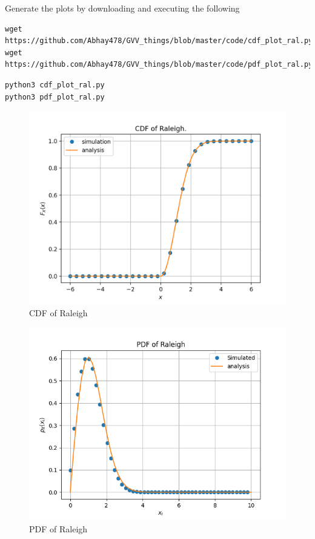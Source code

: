 \documentclass[journal,12pt,twocolumn]{IEEEtran}
\renewcommand\thesection{\arabic{section}}
\theoremstyle{remark}
\numberwithin{equation}{section}
\numberwithin{equation}{section}
\begin{document}
\begin{enumerate}[label=\thesection.\arabic*,ref=\thesection.\theenumi]
Generate the plots by downloading and executing the following
\begin{lstlisting}
wget https://github.com/Abhay478/GVV_things/blob/master/code/cdf_plot_ral.py
wget https://github.com/Abhay478/GVV_things/blob/master/code/pdf_plot_ral.py
\end{lstlisting}

\begin{lstlisting}
python3 cdf_plot_ral.py
python3 pdf_plot_ral.py
\end{lstlisting}

\begin{figure}[!h]
    \caption{CDF of Raleigh}
    \includegraphics[width = \columnwidth]{ral.png}
\end{figure}


\begin{figure}[!h]
    \caption{PDF of Raleigh}
    \includegraphics[width = \columnwidth]{pdf_ral.png}
\end{figure}

\end{enumerate}
\end{document}
